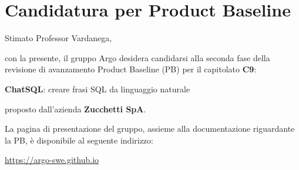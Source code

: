 





\makeFrontPage

\section*{Candidatura per Product Baseline}
\par Stimato Professor Vardanega, \newline

con la presente, il gruppo Argo desidera candidarsi alla seconda fase della revisione di avanzamento Product Baseline (PB) per il capitolato \textbf{C9}: \newline

\quad \textbf{ChatSQL}: creare frasi SQL da linguaggio naturale \newline

proposto dall'azienda \textbf{Zucchetti SpA}. \newline

\par La pagina di presentazione del gruppo, assieme alla documentazione riguardante la PB, è disponibile al seguente indirizzo: \newline

\quad \href{https://argo-swe.github.io}{https://argo-swe.github.io} \newline

